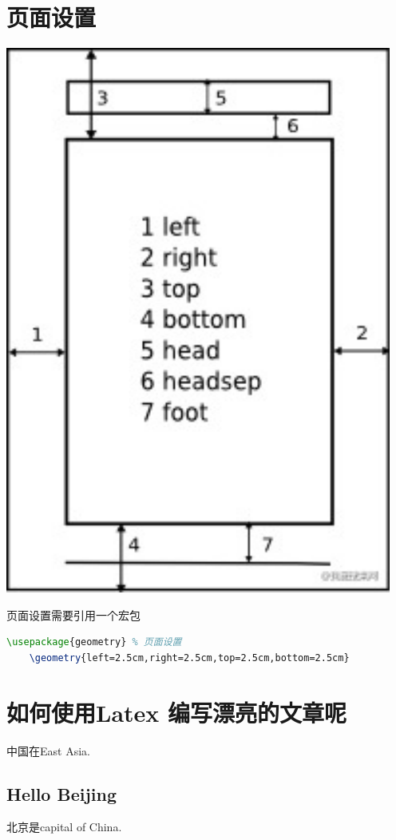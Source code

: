 \documentclass[UTF8]{ctexart}
\begin{document}
\section{页面设置}
\centering
\includegraphics[scale=1]{geometry.png}
\newline

页面设置需要引用一个宏包

\begin{lstlisting}[language=tex]
    \usepackage{geometry} % 页面设置
    \geometry{left=2.5cm,right=2.5cm,top=2.5cm,bottom=2.5cm}
\end{lstlisting}

\section{如何使用Latex 编写漂亮的文章呢}
中国在East Asia.

\subsection{Hello Beijing}
北京是capital of China.
\end{document}
